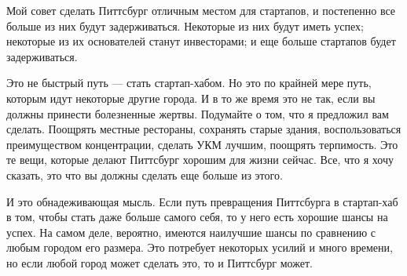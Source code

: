 \documentclass[ebook,12pt,oneside,openany]{memoir}
\begin{document}
Мой совет сделать Питтсбург отличным местом для стартапов, и
постепенно все больше из них будут задерживаться. Некоторые из них
будут иметь успех; некоторые из их основателей станут инвесторами; и
еще больше стартапов будет задерживаться.

Это не быстрый путь — стать стартап-хабом. Но это по крайней мере
путь, которым идут некоторые другие города. И в то же время это не
так, если вы должны принести болезненные жертвы. Подумайте о том, что
я предложил вам сделать. Поощрять местные рестораны, сохранять старые
здания, воспользоваться преимуществом концентрации, сделать УКМ
лучшим, поощрять терпимость. Это те вещи, которые делают Питтсбург
хорошим для жизни сейчас. Все, что я хочу сказать, это что вы должны
сделать еще больше из этого.

И это обнадеживающая мысль. Если путь превращения Питтсбурга в
стартап-хаб в том, чтобы стать даже больше самого себя, то у него есть
хорошие шансы на успех. На самом деле, вероятно, имеются наилучшие
шансы по сравнению с любым городом его размера. Это потребует
некоторых усилий и много времени, но если любой город может сделать
это, то и Питтсбург может.
\end{document}
